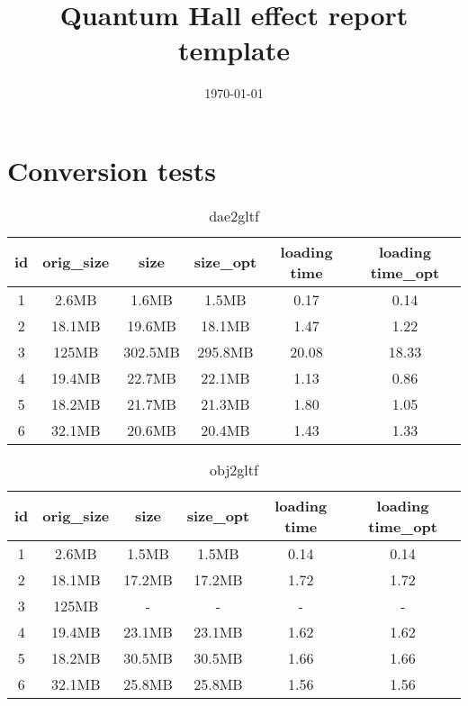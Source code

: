 \documentclass[a4paper]{article}
\title{Quantum Hall effect report template}
\date{\today}
\begin{document}
\section*{Conversion tests}

\begin{table}[h]
\begin{tabular}{cccccc}
id & orig\_size & size & size\_opt & loading time & loading time\_opt \\ \hline
1  & 2.6MB & 1.6MB& 1.5MB     & 0.17 & 0.14                   \\
2  & 18.1MB & 19.6MB& 18.1MB  &  1.47 & 1.22                   \\
3  & 125MB & 302.5MB & 295.8MB &  20.08 & 18.33                  \\
4  & 19.4MB & 22.7MB &  22.1MB & 1.13 & 0.86 \\
5  & 18.2MB & 21.7MB & 21.3MB & 1.80 & 1.05                  \\
6  & 32.1MB & 20.6MB & 20.4MB & 1.43 & 1.33                 
\end{tabular}
\caption{dae2gltf}
\end{table}

\begin{table}[h]
\begin{tabular}{cccccc}
id & orig\_size & size & size\_opt & loading time & loading time\_opt \\ \hline
1  & 2.6MB & 1.5MB& 1.5MB     & 0.14              & 0.14                  \\
2  & 18.1MB & 17.2MB& 17.2MB  & 1.72              & 1.72                  \\
3  & 125MB & - & - &       -       &         -          \\
4  & 19.4MB & 23.1MB &  23.1MB & 1.62                 & 1.62  \\
5  & 18.2MB & 30.5MB & 30.5MB & 1.66             & 1.66                  \\
6  & 32.1MB & 25.8MB & 25.8MB & 1.56             &    1.56               
\end{tabular}
\caption{obj2gltf}
\end{table}
\end{document}

